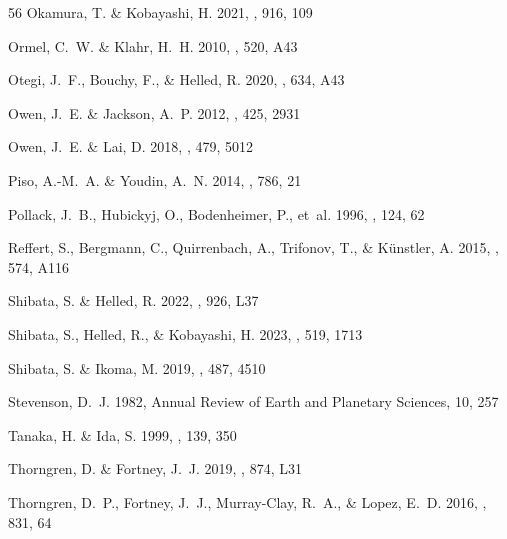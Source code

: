 \documentclass{aa}
\begin{document}
{\begin{thebibliography}{56}
{Okamura}, T. \& {Kobayashi}, H. 2021, \apj, 916, 109

{Ormel}, C.~W. \& {Klahr}, H.~H. 2010, \aap, 520, A43

{Otegi}, J.~F., {Bouchy}, F., \& {Helled}, R. 2020, \aap, 634, A43

{Owen}, J.~E. \& {Jackson}, A.~P. 2012, \mnras, 425, 2931

{Owen}, J.~E. \& {Lai}, D. 2018, \mnras, 479, 5012

{Piso}, A.-M.~A. \& {Youdin}, A.~N. 2014, \apj, 786, 21

{Pollack}, J.~B., {Hubickyj}, O., {Bodenheimer}, P., {et~al.} 1996, \icarus,
  124, 62

{Reffert}, S., {Bergmann}, C., {Quirrenbach}, A., {Trifonov}, T., \&
  {K{\"u}nstler}, A. 2015, \aap, 574, A116

{Shibata}, S. \& {Helled}, R. 2022, \apjl, 926, L37

{Shibata}, S., {Helled}, R., \& {Kobayashi}, H. 2023, \mnras, 519, 1713

{Shibata}, S. \& {Ikoma}, M. 2019, \mnras, 487, 4510

{Stevenson}, D.~J. 1982, Annual Review of Earth and Planetary Sciences, 10, 257

{Tanaka}, H. \& {Ida}, S. 1999, \icarus, 139, 350

{Thorngren}, D. \& {Fortney}, J.~J. 2019, \apjl, 874, L31

{Thorngren}, D.~P., {Fortney}, J.~J., {Murray-Clay}, R.~A., \& {Lopez}, E.~D.
  2016, \apj, 831, 64


\end{thebibliography}}
\end{document}

